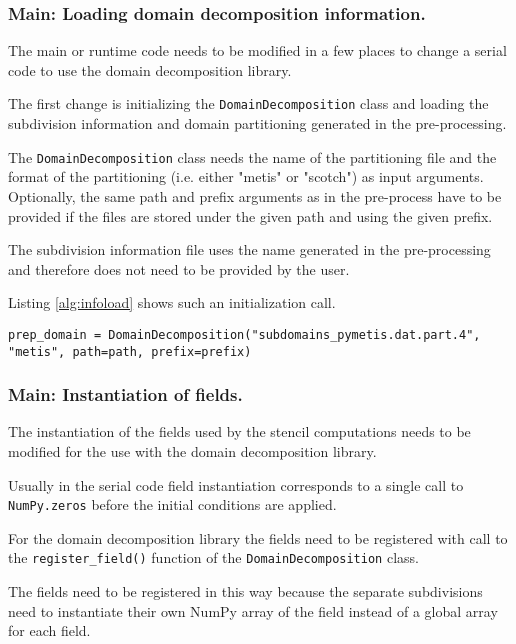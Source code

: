 \subsubsection{Main: Loading domain decomposition information.}
\label{sec:main_loading}
The main or runtime code needs to be modified in a few places to change a serial code to use the domain decomposition library.

The first change is initializing the \texttt{DomainDecomposition} class and loading the subdivision information and domain partitioning generated in the pre-processing.

The \texttt{DomainDecomposition} class needs the name of the partitioning file and the format of the partitioning (i.e. either "metis" or "scotch") as input arguments.
Optionally, the same path and prefix arguments as in the pre-process have to be provided if the files are stored under the given path and using the given prefix.

The subdivision information file uses the name generated in the pre-processing and therefore does not need to be provided by the user.

Listing \ref{alg:infoload} shows such an initialization call.

\begin{lstlisting}[caption={Example code for the loading of the domain decomposition information.},captionpos=b, label={alg:infoload}, float, floatplacement=H]
prep_domain = DomainDecomposition("subdomains_pymetis.dat.part.4", "metis", path=path, prefix=prefix)
\end{lstlisting}

\subsubsection{Main: Instantiation of fields.}
The instantiation of the fields used by the stencil computations needs to be modified for the use with the domain decomposition library.

Usually in the serial code field instantiation corresponds to a single call to \texttt{NumPy.zeros} before the initial conditions are applied.

For the domain decomposition library the fields need to be registered with call to the \texttt{register\_field()} function of the \texttt{DomainDecomposition} class.

The fields need to be registered in this way because the separate subdivisions need to instantiate their own NumPy array of the field instead of a global array for each field.

